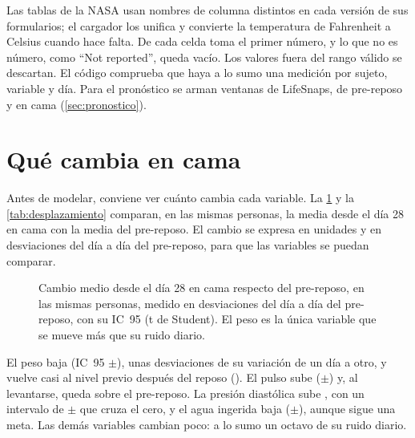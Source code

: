 Las tablas de la NASA usan nombres de columna distintos en cada versión de sus formularios; el cargador los unifica y
convierte la temperatura de Fahrenheit a Celsius cuando hace falta. De cada celda toma el primer número, y lo que no
es número, como \enquote{Not reported}, queda vacío. Los valores fuera del rango válido se descartan. El código
comprueba que haya a lo sumo una medición por sujeto, variable y día. Para el pronóstico se arman
 ventanas de LifeSnaps,  de pre-reposo y  en cama
(\cref{sec:pronostico}).

\section{Qué cambia en cama}\label{sec:desplazamiento}

Antes de modelar, conviene ver cuánto cambia cada variable. La \cref{fig:desplazamiento} y la \cref{tab:desplazamiento}
comparan, en las mismas personas, la media desde el día 28 en cama con la media del pre-reposo. El cambio se expresa
en unidades y en desviaciones del día a día del pre-reposo, para que las variables se puedan comparar.

\begin{figure}[htbp]

\caption[Cuánto cambia cada variable en cama]{Cambio medio desde el día 28 en cama respecto del pre-reposo, en las
mismas personas, medido en desviaciones del día a día del pre-reposo, con su IC~95\pct{} (t de Student). El peso es
la única variable que se mueve más que su ruido diario.}
\label{fig:desplazamiento}
\end{figure}

\begin{table}[htbp]
\caption[Desplazamiento de cada variable en cama]{Desplazamiento de cada variable: media desde el día 28 en cama menos
media del pre-reposo, pareado por sujeto. \enquote{DE diaria}: mediana entre personas de la desviación del pre-reposo.
\enquote{Post $-$ pre}: media del post-reposo menos la del pre-reposo.}
\label{tab:desplazamiento}
\small

\end{table}

El peso baja  (IC~95\pct{} $\pm$), unas 
desviaciones de su variación de un día a otro, y vuelve casi al nivel previo después del reposo
(). El pulso sube  ($\pm$) y, al
levantarse, queda  sobre el pre-reposo. La presión diastólica sube
, con un intervalo de $\pm$ que cruza el cero, y el agua ingerida
baja  ($\pm$), aunque sigue una meta. Las demás variables cambian
poco: a lo sumo un octavo de su ruido diario.

